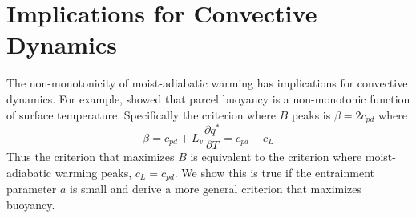 \documentclass[]{ametsocV6.1}
\begin{document}
\section{Implications for Convective Dynamics}
The non-monotonicity of moist-adiabatic warming has implications for convective dynamics. For example, \cite{romps2016} showed that parcel buoyancy is a non-monotonic function of surface temperature. Specifically the criterion where $B$ peaks is $\beta = 2c_{pd}$ where
\begin{equation}
\beta = c_{pd} + L_v\frac{\partial q^*}{\partial T} = c_{pd} + c_L
\end{equation}
Thus the \cite{romps2016} criterion that maximizes $B$ is equivalent to the criterion where moist-adiabatic warming peaks, $c_L = c_{pd}$. We show this is true if the entrainment parameter $a$ is small and derive a more general criterion that maximizes buoyancy. 
\end{document}

